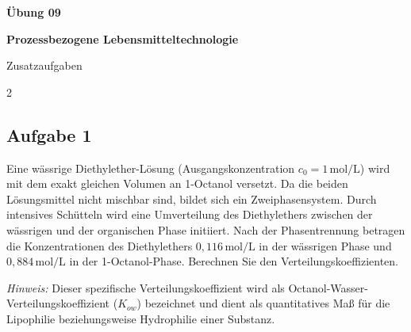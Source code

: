 \documentclass[a4paper,10pt]{article}
\begin{document}


\begin{center}
\LARGE
\color{uniblau}
\textbf{Übung 09} \par \vspace*{2mm}
\large \color{miugray!50!black} \textbf{Prozessbezogene Lebensmitteltechnologie}\par 
\normalsize Zusatzaufgaben
\end{center}
\par 


\color{miudiutex}


\vspace*{4mm}
\begin{multicols}{2}

\subsection*{Aufgabe 1}
Eine wässrige Diethylether-Lösung (Ausgangskonzentration $c_0 = 1\,\text{mol/L}$) wird mit dem exakt gleichen Volumen an 1-Octanol versetzt. Da die beiden Lösungsmittel nicht mischbar sind, bildet sich ein Zweiphasensystem. Durch intensives Schütteln wird eine Umverteilung des Diethylethers zwischen der wässrigen und der organischen Phase initiiert. Nach der Phasentrennung betragen die Konzentrationen des Diethylethers $0{,}116\,\text{mol/L}$ in der wässrigen Phase und $0{,}884\,\text{mol/L}$ in der 1-Octanol-Phase. Berechnen Sie den Verteilungskoeffizienten.

\pp 
\textit{Hinweis:} Dieser spezifische Verteilungskoeffizient wird als Octanol-Wasser-Verteilungskoeffizient ($K_{ow}$) bezeichnet und dient als quantitatives Maß für die Lipophilie beziehungsweise Hydrophilie einer Substanz.

\begin{figure}[H]
\centering
{}
\end{figure}
\end{multicols}
\end{document}
